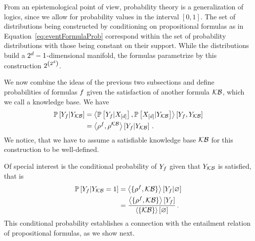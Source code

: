 From an epistemological point of view, probability theory is a generalization of logics, since we allow for probability values in the interval $[0,1]$.
The set of distributions being constructed by conditioning on propositional formulas as in Equation~\eqref{eq:eventFormulaProb} correspond within the set of probability distributions with those being constant on their support.
While the distributions build a $2^d-1$-dimensional manifold, the formulas parametrize by this construction $2^{\left(2^d\right)}$.%





We now combine the ideas of the previous two subsections and define probabilities of formulas $f$ given the satisfaction of another formula $\mathcal{KB}$, which we call a knowledge base.
We have %
\begin{align*}
    \mathbb{P}\left[Y_{f}|Y_{\mathcal{KB}}\right]
    & = \left\langle 
        \mathbb{P}\left[Y_{f}|X_{[d]}\right], \mathbb{P}\left[X_{[d]}|Y_{\mathcal{KB}}\right]
    \right\rangle \left[ Y_{f},Y_{\mathcal{KB}} \right] \\
    & = \left\langle \rho^{f},\rho^{\mathcal{KB}}\right\rangle \left[ Y_{f} | Y_{\mathcal{KB}} \right] \, .
\end{align*}
We notice, that we have to assume a satisfiable knowledge base $\mathcal{KB}$ for this construction to be well-defined.

% 
Of special interest is the conditional probability of $Y_{f}$ given that $Y_{\mathcal{KB}}$ is satisfied, that is
\begin{align*}
    \mathbb{P}\left[Y_{f}|Y_{\mathcal{KB}}=1\right]
    & = \left\langle \{\rho^{f} ,\mathcal{KB}\}\right\rangle \left[ Y_{f} | \varnothing \right]\\
    & = \frac{\left\langle \{\rho^{f},\mathcal{KB}\}\right\rangle \left[ Y_{f} \right]}{\left\langle \{\mathcal{KB}\}\right\rangle \left[ \varnothing \right]} \, .
\end{align*}
This conditional probability establishes a connection with the entailment relation of propositional formulas, as we show next.

